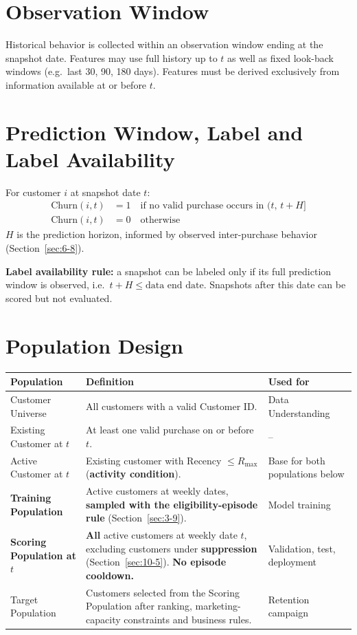 \section{Observation Window}
\label{sec:3-5}

Historical behavior is collected within an observation window ending at the snapshot date. Features may use full history up to $t$ as well as fixed look-back windows (e.g.\ last 30, 90, 180 days). Features must be derived exclusively from information available at or before $t$.

\section{Prediction Window, Label and Label Availability}
\label{sec:3-6}

For customer $i$ at snapshot date $t$:
\begin{align*}
    \text{Churn}(i, t) &= 1 \quad \text{if no valid purchase occurs in } (t,\, t+H] \\
    \text{Churn}(i, t) &= 0 \quad \text{otherwise}
\end{align*}
$H$ is the prediction horizon, informed by observed inter-purchase behavior (Section~\ref{sec:6-8}).

\textbf{Label availability rule:} a snapshot can be labeled only if its full prediction window is observed, i.e.\ $t + H \leq \text{data end date}$. Snapshots after this date can be scored but not evaluated.

\section{Population Design}
\label{sec:3-7}

\begin{center}
\begin{tabular}{@{}p{3.2cm}p{7cm}p{4.3cm}@{}}
    \toprule
    Population & Definition & Used for \\
    \midrule
    Customer Universe & All customers with a valid Customer ID. & Data Understanding \\
    Existing Customer at $t$ & At least one valid purchase on or before $t$. & -- \\
    Active Customer at $t$ & Existing customer with Recency $\leq R_{\max}$ (\textbf{activity condition}). & Base for both populations below \\
    \textbf{Training Population} & Active customers at weekly dates, \textbf{sampled with the eligibility-episode rule} (Section~\ref{sec:3-9}). & Model training \\
    \textbf{Scoring Population at $t$} & \textbf{All} active customers at weekly date $t$, excluding customers under \textbf{suppression} (Section~\ref{sec:10-5}). \textbf{No episode cooldown.} & Validation, test, deployment \\
    Target Population & Customers selected from the Scoring Population after ranking, marketing-capacity constraints and business rules. & Retention campaign \\
    \bottomrule
\end{tabular}
\end{center}

